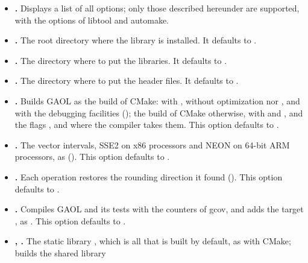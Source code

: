 \documentclass[12pt,a4paper,twoside,openright]{book}
\begin{document}
\begin{itemize}
\item[$\bullet$] \textbf{.} Displays a list of all options; only
  those described hereunder are supported, with the options of libtool and
  automake.
%
\item[$\bullet$] \textbf{.} The root directory
  where the library is installed. It defaults to .
\item[$\bullet$] \textbf{.} The directory where
  to put the libraries. It defaults to .
\item[$\bullet$] \textbf{.} The
  directory where to put the header files. It defaults to
  .
\item[$\bullet$] \textbf{.} Builds GAOL
  as the  build of CMake: with , without optimization
  nor , and with the debugging facilities
  (); the  build of CMake
  otherwise, with  and , and the flags
  ,  and
   where the compiler takes them. This
  option defaults to .
%
%
\item[$\bullet$] \textbf{.} The vector
  intervals, SSE2 on x86 processors and NEON on 64-bit ARM processors, as
   (). This option defaults to
  .\newinvfive
\item[$\bullet$] \textbf{.}
  Each operation restores the rounding direction it found
  (). This option defaults to .
%
\item[$\bullet$] \textbf{.} Compiles
  GAOL and its tests with the counters of gcov, and adds the target
  , as . This option defaults to
  .\newinvfive
\item[$\bullet$] \textbf{,
  .} The static library
  , which is all that is built by default, as with CMake;
   builds the shared library 

\end{itemize}
\end{document}
